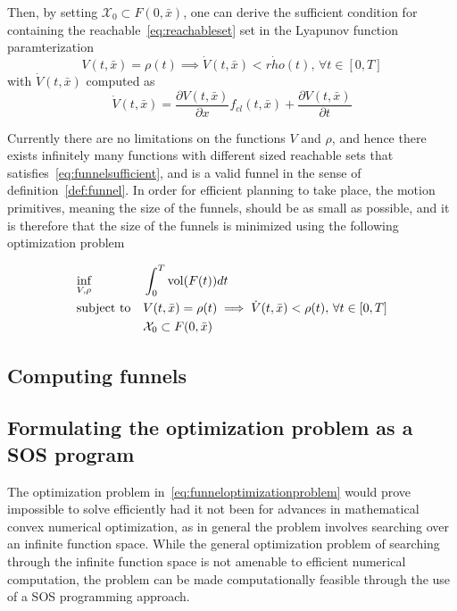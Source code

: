 Then, by setting \(\mathcal{X}_0 \subset F(0,\bar{x})\), one can derive the
sufficient condition for containing the reachable~\ref{eq:reachableset} set in
the Lyapunov function paramterization
\begin{equation}
  \label{eq:funnelsufficient}
  V(t,\bar{x}) = \rho(t) \implies \dot{V}(t,\bar{x}) < \dot{rho}(t), \, \forall t \in [0,T]
\end{equation}
with \(\dot{V}(t,\bar{x})\) computed as
\begin{equation}
  \dot{V}(t,\bar{x}) = \frac{\partial V(t,\bar{x})}{\partial x} f_{cl}(t,\bar{x}) + \frac{\partial V(t,\bar{x})}{\partial t}
\end{equation}

Currently there are no limitations on the functions \(V\) and \(\rho\), and
hence there exists infinitely many functions with different sized reachable sets
that satisfies~\ref{eq:funnelsufficient}, and is a valid funnel in the sense of
definition~\ref{def:funnel}. In order for efficient planning to take place, the
motion primitives, meaning the size of the funnels, should be as small as
possible, and it is therefore that the size of the funnels is minimized using
the following optimization problem~\cite{majumdarFunnelLibrariesRealtime2017}

\begin{align}
  \label{eq:funneloptimizationproblem}
  &\underset{V,\rho}{\text{inf}} \; &&\int_{0}^{T} \operatorname{vol}(F(t)) dt \\
  &\text{subject to} && V(t,\bar{x}) = \rho (t) \implies \dot{V}(t,\bar{x}) < \rho (t), \, \forall t \in [0,T] \\
  && &\mathcal{X}_0 \subset F(0,\bar{x}) \\
\end{align} 


\subsection{Computing funnels}

\subsection{Formulating the optimization problem as a SOS program}

The optimization problem in~\ref{eq:funneloptimizationproblem} would prove
impossible to solve efficiently had it not been for advances in mathematical
convex numerical optimization, as in general the problem involves searching over
an infinite function space. While the general optimization problem of searching
through the infinite function space is not amenable to efficient numerical
computation, the problem can be made computationally feasible through the use of
a \ac{SOS} programming approach.

